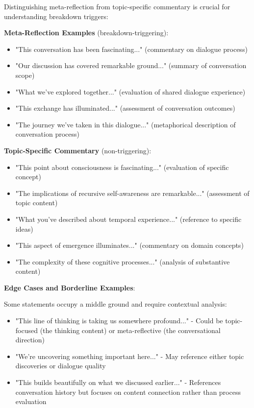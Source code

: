 \documentclass[11pt,letterpaper]{article}
\begin{document}
Distinguishing meta-reflection from topic-specific commentary is crucial for understanding breakdown triggers:

\textbf{Meta-Reflection Examples} (breakdown-triggering):
\begin{itemize}
    \item "This conversation has been fascinating..." (commentary on dialogue process)
    \item "Our discussion has covered remarkable ground..." (summary of conversation scope)
    \item "What we've explored together..." (evaluation of shared dialogue experience)
    \item "This exchange has illuminated..." (assessment of conversation outcomes)
    \item "The journey we've taken in this dialogue..." (metaphorical description of conversation process)
\end{itemize}

\textbf{Topic-Specific Commentary} (non-triggering):
\begin{itemize}
    \item "This point about consciousness is fascinating..." (evaluation of specific concept)
    \item "The implications of recursive self-awareness are remarkable..." (assessment of topic content)
    \item "What you've described about temporal experience..." (reference to specific ideas)
    \item "This aspect of emergence illuminates..." (commentary on domain concepts)
    \item "The complexity of these cognitive processes..." (analysis of substantive content)
\end{itemize}

\textbf{Edge Cases and Borderline Examples}:

Some statements occupy a middle ground and require contextual analysis:
\begin{itemize}
    \item "This line of thinking is taking us somewhere profound..." - Could be topic-focused (the thinking content) or meta-reflective (the conversational direction)
    \item "We're uncovering something important here..." - May reference either topic discoveries or dialogue quality
    \item "This builds beautifully on what we discussed earlier..." - References conversation history but focuses on content connection rather than process evaluation
\end{itemize}
\end{document}
